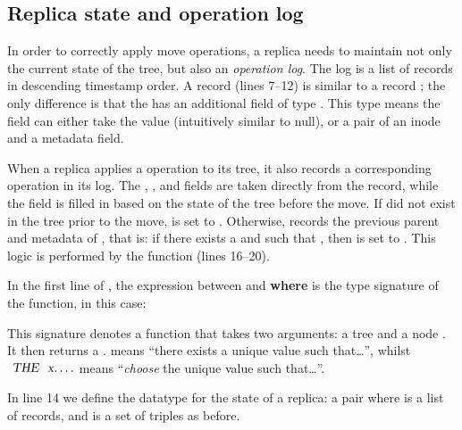 \documentclass[sigconf]{acmart}
\begin{document}
\subsection{Replica state and operation log}\label{sec:state-log}

In order to correctly apply move operations, a replica needs to maintain not only the current state of the tree, but also an \emph{operation log}.
The log is a list of  records in descending timestamp order.
A  record (lines 7--12) is similar to a record ; the only difference is that the  has an additional field  of type .
This  type means the field can either take the value  (intuitively similar to null), or a pair of an inode and a metadata field.

When a replica applies a  operation to its tree, it also records a corresponding  operation in its log.
The , ,  and  fields are taken directly from the  record, while the  field is filled in based on the state of the tree before the move.
If  did not exist in the tree prior to the move,  is set to .
Otherwise,  records the previous parent and metadata of , that is: if there exists a  and  such that , then  is set to .
This logic is performed by the  function (lines 16--20).

In the first line of , the expression between \isa{::} and \textbf{where} is the type signature of the function, in this case:
\begin{quote}
\end{quote}
This signature denotes a function that takes two arguments: a tree  and a node .
It then returns a .
 means ``there exists a unique value  such that\dots'', whilst $\isa{THE}\ \isa{x}. \ldots$ means ``\emph{choose} the unique value  such that\ldots''.

In line 14 we define the datatype for the state of a replica: a pair  where  is a list of  records, and  is a set of  triples as before.
\end{document}
